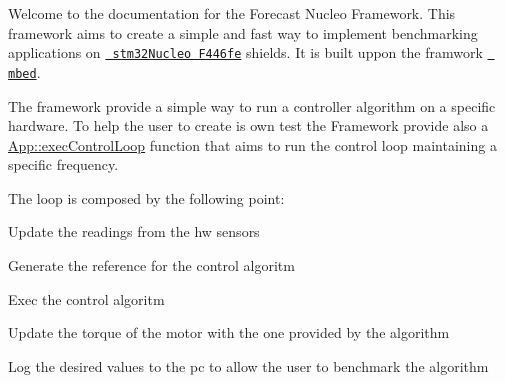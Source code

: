 Welcome to the documentation for the Forecast Nucleo Framework. This framework aims to create a simple and fast way to implement benchmarking applications on \href{https://os.mbed.com/platforms/ST-Nucleo-F446RE/}{\texttt{ stm32\+Nucleo F446fe}} shields. It is built uppon the framwork \href{https://os.mbed.com/}{\texttt{ mbed}}.

The framework provide a simple way to run a controller algorithm on a specific hardware. To help the user to create is own test the Framework provide also a \mbox{\hyperlink{classforecast_1_1_app_a87fd26ed219244a074e6956773443994}{App\+::exec\+Control\+Loop}} function that aims to run the control loop maintaining a specific frequency.

The loop is composed by the following point\+:
\begin{DoxyItemize}
\item {\ttfamily Update the readings from the hw sensors}
\item {\ttfamily Generate the reference for the control algoritm}
\item {\ttfamily Exec the control algoritm}
\item {\ttfamily Update the torque of the motor with the one provided by the algorithm}
\item {\ttfamily Log the desired values to the pc to allow the user to benchmark the algorithm} 
\end{DoxyItemize}